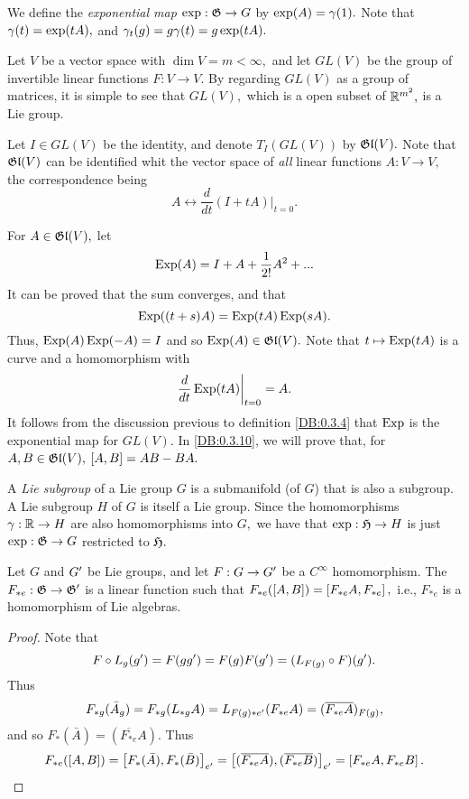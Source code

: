 \begin{defn}
\label{DB:0.3.4}
 We define the \emph{exponential map} $\exp:\mathfrak{G} \to G$ by $\exp(A)=\gamma(1).$ Note that $\gamma(t)=\exp(tA),$ and
$\gamma_{t}(g)=g\gamma(t)=g \exp(tA).$
\end{defn}

\begin{exmp}
\label{DB:0.3.5}
 Let $V$ be a vector space with $\dim V = m <\infty,$ and let $GL(V)$ be the group of invertible linear functions $F:V
\to V.$ By regarding $GL(V)$ as a group of matrices, it is simple to see that $GL(V),$ which is a open subset of
$\mathbb R^{m^{2}},$ is a Lie group.

Let $I \in GL(V)$ be the identity, and denote $T_{I}(GL(V))$ by $\mathfrak{Gl}(V).$ Note that $\mathfrak{Gl}(V)$ can be
identified whit the vector space of \emph{all} linear functions $A:V \to V,$ the correspondence being
$$
A \leftrightarrow \frac{d}{dt}(I+tA)\bigg|_{t=0}.
$$

For $A \in \mathfrak{Gl}(V),$ let
$$
\operatorname{Exp}(A)= I + A + \frac{1}{2!}A^{2} + ...
$$
It can be proved that the sum converges, and that $$\operatorname{Exp}((t+s)A)=\operatorname{Exp}(tA)\operatorname{Exp}(sA).$$ Thus, $\operatorname{Exp}(A)\operatorname{Exp}(-A)=I$ and so
$\operatorname{Exp}(A)\in \mathfrak{Gl}(V).$ Note that $t \mapsto \operatorname{Exp}(tA)$ is a curve and a homomorphism with
$$
\frac{d}{dt}\operatorname{Exp}(tA)\bigg|_{t=0}=A.
$$
It follows from the discussion previous to definition \ref{DB:0.3.4} that $\operatorname{Exp}$ is the exponential map for $GL(V).$ In
\ref{DB:0.3.10}, we will prove that, for $A,B \in \mathfrak{Gl}(V),$ $\left[A,B\right]=AB-BA.$
\end{exmp}

\begin{defn}
 \label{DB:0.3.6}
A \emph{Lie subgroup} of a Lie group $G$ is a submanifold (of $G$) that is also a subgroup. A Lie subgroup $H$ of $G$
is itself a Lie group. Since the homomorphisms $\gamma:\mathbb R \to H$ are also homomorphisms into $G,$ we have that $\exp:
\mathfrak{H} \to H$ is just $\exp: \mathfrak{G} \to G$ restricted to $\mathfrak{H}.$
\end{defn}

\begin{thm}
 \label{DB:0.3.7}
Let $G$ and ${G}^{\prime}$ be Lie groups, and let $F:G \to {G}^{\prime}$ be a $C^{\infty}$ homomorphism. The $F_{*e}: \mathfrak{G} \to
{\mathfrak{G}}^{\prime}$ is a linear function such that $F_{*e}(\left[A,B\right])=\left[F_{*e}A,F_{*e}\right],$ i.e., $F_{*e}$ is a
homomorphism of Lie algebras.
\end{thm}

\begin{proof}
 Note that $$F \circ L_{g}({g}^{\prime})=F(g{g}^{\prime})=F(g)F({g}^{\prime})=(L_{F(g)}\circ F)({g}^{\prime}).$$ Thus
$$
F_{*g}(\bar{A}_{g})=F_{*g}(L_{*g}A)=L_{F(g)*{e}^{\prime}}(F_{*e}A)=(\overline{F_{*e}A})_{F(g)},$$ and so
$F_{*}(\bar{A})=(\overline{F_{*e}}A).$ Thus
$$
F_{*e}(\left[A,B\right])=\left[F_{*}(\bar{A}),F_{*}(\bar{B})\right]_{{e}^{\prime}}=\left[(\overline{F_{*e}A}),(\overline{F_{*e}B})\right]_{{e}^{\prime}}=\left[F_{*e}A,F_{*e}B\right].
$$
\end{proof}

